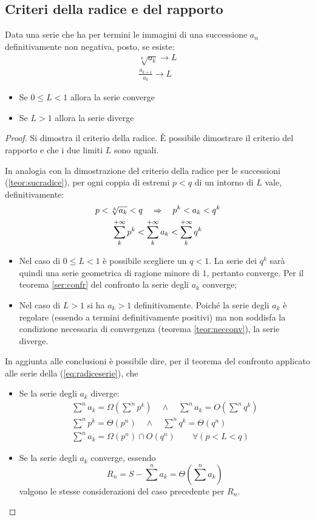 \subsection{Criteri della radice e del rapporto}
\begin{teor}
	Data una serie che ha per termini le immagini di una successione $a_n$ definitivamente non negativa, posto, se esiste:
	\begin{gather*}
		\sqrt[k]{a_k}\to L\\
		\frac{a_{k+1}}{a_k}\to L
	\end{gather*}
	\begin{itemize}
		\item Se $0\leq L<1$ allora la serie converge
		\item Se $L>1$ allora la serie diverge
	\end{itemize}
\end{teor}
\begin{proof}
	Si dimostra il criterio della radice. È possibile dimostrare il criterio del rapporto e che i due limiti $L$ sono uguali.

	In analogia con la dimostrazione del criterio della radice per le successioni (\vref{teor:sucradice}), per ogni coppia di estremi $p<q$ di un intorno di $L$ vale, definitivamente:
	\begin{gather}
		p<\sqrt[k]{a_k}<q\quad\Rightarrow\quad p^k<a_k<q^k\notag\\
		\label{eq:radiceserie}
		\sum_k^{+\infty}p^k<\sum_k^{+\infty}a_k<\sum_k^{+\infty}q^k
	\end{gather}
	\begin{itemize}
		\item Nel caso di $0\leq L<1$ è possibile scegliere un $q<1$. La serie dei $q^k$ sarà quindi una serie geometrica di ragione minore di $1$, pertanto converge. Per il teorema \ref{ser:confr} del confronto la serie degli $a_k$ converge;
		\item Nel caso di $L>1$ si ha $a_k>1$ definitivamente. Poiché la serie degli $a_k$ è regolare (essendo a termini definitivamente positivi) ma non soddisfa la condizione necessaria di convergenza (teorema \ref{teor:necconv}), la serie diverge.
	\end{itemize}
	In aggiunta alle conclusioni è possibile dire, per il teorema del confronto applicato alle serie della (\ref{eq:radiceserie}), che
	\begin{itemize}
		\item Se la serie degli $a_k$ diverge:
		      \begin{gather*}
			      \sum^n a_k=\Omega\left(\sum^n p^k\right)\quad\land\quad \sum^n a_k=O\left(\sum^n q^k\right)\\
			      \sum^n p^k=\Theta(p^n)\quad\land\quad \sum^n q^k=\Theta(q^n)\\
			      \sum^n a_k=\Omega(p^n)\cap O(q^n) \qquad \forall(p<L<q)
		      \end{gather*}
		\item Se la serie degli $a_k$ converge, essendo
		      \[
			      R_n=S-\sum^n a_k=\Theta\left(\sum^n a_k\right)
		      \]
		      valgono le stesse considerazioni del caso precedente per $R_n$.
	\end{itemize}
\end{proof}
